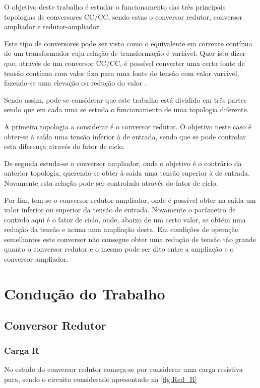\documentclass[a4paper,11pt]{article}
\numberwithin{equation}{section}
\begin{document}
O objetivo deste trabalho é estudar o funcionamento das três principais topologias de conversores CC/CC, sendo estas o conversor redutor, conversor ampliador e redutor-ampliador.

Este tipo de conversores pode ser visto como o equivalente em corrente contínua de um transformador cuja relação de transformação é variável. Quer isto dizer que, através de um conversor CC/CC, é possível converter uma certa fonte de tensão contínua com valor fixo para uma fonte de tensão com valor variável, fazendo-se uma elevação ou redução do valor \cite{Rashid}. 

Sendo assim, pode-se considerar que este trabalho está dividido em três partes sendo que em cada uma se estuda o funcionamento de uma topologia diferente.

A primeira topologia a considerar é o conversor redutor. O objetivo neste caso é obter-se à saída uma tensão inferior à de entrada, sendo que se pode controlar esta diferença através do fator de ciclo.

De seguida estuda-se o conversor ampliador, onde o objetivo é o contrário da anterior topologia, querendo-se obter à saída uma tensão superior à de entrada. Novamente esta relação pode ser controlada através do fator de ciclo.

Por fim, tem-se o conversor redutor-ampliador, onde é possível obter na saída um valor inferior ou superior da tensão de entrada. Novamente o parâmetro de controlo aqui é o fator de ciclo, onde, abaixo de um certo valor, se obtém uma redução da tensão e acima uma ampliação desta. Em condições de operação semelhantes este conversor não consegue obter uma redução de tensão tão grande quanto o conversor redutor e o mesmo pode ser dito entre a ampliação e o conversor ampliador.


\section{Condução do Trabalho}

\subsection{Conversor Redutor}

\subsubsection{Carga R}

No estudo do conversor redutor começa-se por considerar uma carga resistiva pura, sendo o circuito considerado apresentado na \autoref{fig:Red_R}
\end{document}
